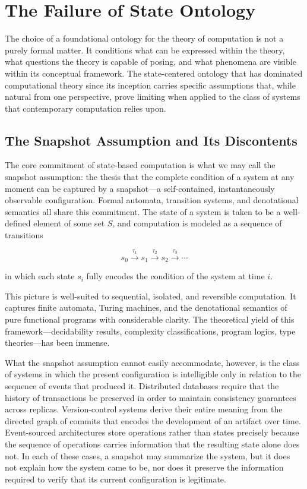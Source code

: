 \documentclass[12pt]{article}
\begin{document}

\section{The Failure of State Ontology}
\label{sec:failure}

The choice of a foundational ontology for the theory of computation is not a purely formal matter. It conditions what can be expressed within the theory, what questions the theory is capable of posing, and what phenomena are visible within its conceptual framework. The state-centered ontology that has dominated computational theory since its inception carries specific assumptions that, while natural from one perspective, prove limiting when applied to the class of systems that contemporary computation relies upon.

\subsection{The Snapshot Assumption and Its Discontents}

The core commitment of state-based computation is what we may call the snapshot assumption: the thesis that the complete condition of a system at any moment can be captured by a snapshot---a self-contained, instantaneously observable configuration. Formal automata, transition systems, and denotational semantics all share this commitment. The state of a system is taken to be a well-defined element of some set $S$, and computation is modeled as a sequence of transitions

\[
s_0 \xrightarrow{\tau_1} s_1 \xrightarrow{\tau_2} s_2 \xrightarrow{\tau_3} \cdots
\]

in which each state $s_i$ fully encodes the condition of the system at time $i$.

This picture is well-suited to sequential, isolated, and reversible computation. It captures finite automata, Turing machines, and the denotational semantics of pure functional programs with considerable clarity. The theoretical yield of this framework---decidability results, complexity classifications, program logics, type theories---has been immense.

What the snapshot assumption cannot easily accommodate, however, is the class of systems in which the present configuration is intelligible only in relation to the sequence of events that produced it. Distributed databases require that the history of transactions be preserved in order to maintain consistency guarantees across replicas. Version-control systems derive their entire meaning from the directed graph of commits that encodes the development of an artifact over time. Event-sourced architectures store operations rather than states precisely because the sequence of operations carries information that the resulting state alone does not. In each of these cases, a snapshot may summarize the system, but it does not explain how the system came to be, nor does it preserve the information required to verify that its current configuration is legitimate.
\end{document}
